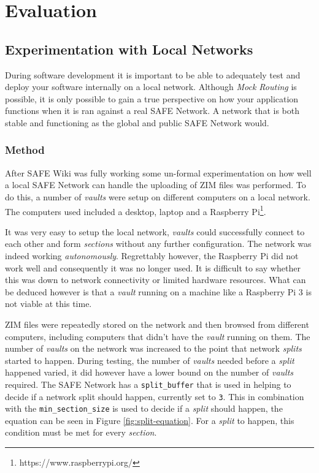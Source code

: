 \chapter{Evaluation}

\section{Experimentation with Local Networks}

During software development it is important to be able to adequately test and deploy your software internally on a local network. Although \textit{Mock Routing} is possible, it is only possible to gain a true perspective on how your application functions when it is ran against a real SAFE Network. A network that is both stable and functioning as the global and public SAFE Network would.

\subsection{Method}

After SAFE Wiki was fully working some un-formal experimentation on how well a local SAFE Network can handle the uploading of ZIM files was performed. To do this, a number of \textit{vaults} were setup on different computers on a local network. The computers used included a desktop, laptop and a Raspberry Pi\footnote{https://www.raspberrypi.org/}.

It was very easy to setup the local network, \textit{vaults} could successfully connect to each other and form \textit{sections} without any further configuration. The network was indeed working \textit{autonomously}. Regrettably however, the Raspberry Pi did not work well and consequently it was no longer used. It is difficult to say whether this was down to network connectivity or limited hardware resources. What can be deduced however is that a \textit{vault} running on a machine like a Raspberry Pi 3 is not viable at this time.

ZIM files were repeatedly stored on the network and then browsed from different computers, including computers that didn't have the \textit{vault} running on them. The number of \textit{vaults} on the network was increased to the point that network \textit{splits} started to happen. During testing, the number of \textit{vaults} needed before a \textit{split} happened varied, it did however have a lower bound on the number of \textit{vaults} required. The SAFE Network has a \texttt{split\_buffer} that is used in helping to decide if a network split should happen, currently set to \texttt{3}. This in combination with the \texttt{min\_section\_size} is used to decide if a \textit{split} should happen, the equation can be seen in Figure \ref{fig:split-equation}. For a \textit{split} to happen, this condition must be met for every \textit{section}.

